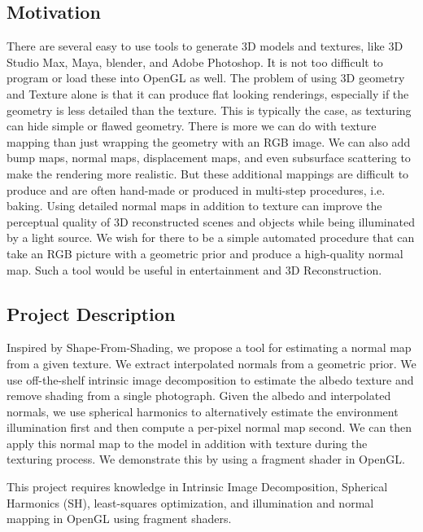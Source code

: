 \documentclass[10pt,twocolumn,letterpaper]{article}
\begin{document}
\subsection{Motivation}
 There are several easy to use tools to generate 3D models and textures, like 3D Studio Max, Maya, blender, and Adobe Photoshop. It is not too difficult to program or load these into OpenGL as well. The problem of using 3D geometry and Texture alone is that it can produce flat looking renderings, especially if the geometry is less detailed than the texture. This is typically the case, as texturing can hide simple or flawed geometry. There is more we can do with texture mapping than just wrapping the geometry with an RGB image. We can also add bump maps, normal maps, displacement maps, and even subsurface scattering to make the rendering more realistic. But these additional mappings are difficult to produce and are often hand-made or produced in multi-step procedures, i.e. baking. Using detailed normal maps in addition to texture can improve the perceptual quality of 3D reconstructed scenes and objects while being illuminated by a light source. We wish for there to be a simple automated procedure that can take an RGB picture with a geometric prior and produce a high-quality normal map. Such a tool would be useful in entertainment and 3D Reconstruction.


\subsection{Project Description}
Inspired by Shape-From-Shading, we propose a tool for estimating a normal map from a given texture. We extract interpolated normals from a geometric prior. We use off-the-shelf intrinsic image decomposition to estimate the albedo texture and remove shading from a single photograph. Given the albedo and interpolated normals, we use spherical harmonics to alternatively estimate the environment illumination first and then compute a per-pixel normal map second. We can then apply this normal map to the model in addition with texture during the texturing process. We demonstrate this by using a fragment shader in OpenGL. \par
This project requires knowledge in Intrinsic Image Decomposition, Spherical Harmonics (SH), least-squares optimization, and illumination and normal mapping in OpenGL using fragment shaders.
\end{document}
